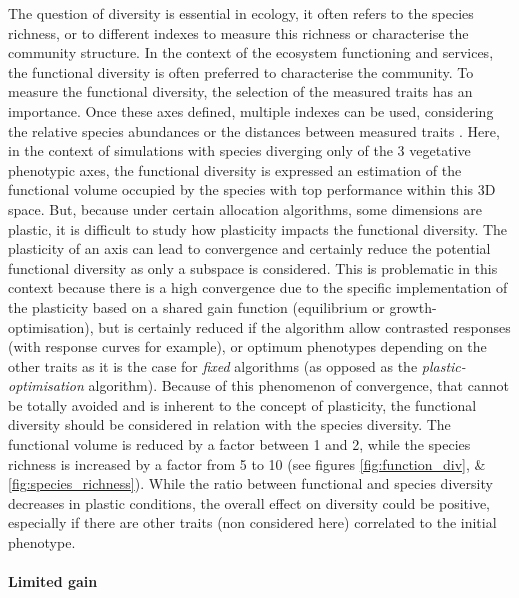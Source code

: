 The question of diversity is essential in ecology, it often refers to the species richness, or to different indexes to measure this richness or characterise the community structure. In the context of the ecosystem functioning and services, the functional diversity is often preferred to characterise the community. To measure the functional diversity, the selection of the measured traits has an importance. Once these axes defined, multiple indexes can be used, considering the relative species abundances or the distances between measured traits \parencite{laliberte_distance-based_2010}. Here, in the context of simulations with species diverging only of the 3 vegetative phenotypic axes, the functional diversity is expressed an estimation of the functional volume occupied by the species with top performance within this 3D space. But, because under certain allocation algorithms, some dimensions are plastic, it is difficult to study how plasticity impacts the functional diversity. The plasticity of an axis can lead to convergence and certainly reduce the potential functional diversity as only a subspace is considered. This is problematic in this context because there is a high convergence due to the specific implementation of the plasticity based on a shared gain function (equilibrium or growth-optimisation), but is certainly reduced if the algorithm allow contrasted responses (with response curves for example), or optimum phenotypes depending on the other traits as it is the case for \textit{fixed} algorithms (as opposed as the \textit{plastic-optimisation} algorithm). Because of this phenomenon of convergence, that cannot be totally avoided and is inherent to the concept of plasticity, the functional diversity should be considered in relation with the species diversity. The functional volume is reduced by a factor between 1 and 2, while the species richness is increased by a factor from 5 to 10 (see figures \ref{fig:function_div}, \& \ref{fig:species_richness}). While the ratio between functional and species diversity decreases in plastic conditions, the overall effect on diversity could be positive, especially if there are other traits (non considered here) correlated to the initial phenotype. 

\paragraph{Limited gain}

